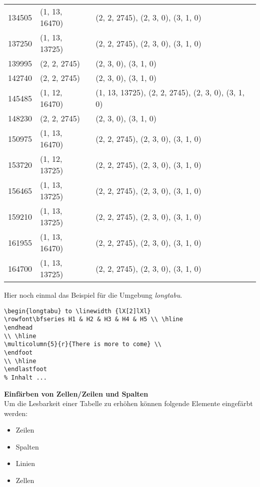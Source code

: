 \begin{center}
\begin{longtable}{|l|l|l|}
		134505 & (1, 13, 16470) & (2, 2, 2745), (2, 3, 0), (3, 1, 0) \\
		137250 & (1, 13, 13725) & (2, 2, 2745), (2, 3, 0), (3, 1, 0) \\
		139995 & (2, 2, 2745) & (2, 3, 0), (3, 1, 0) \\
		142740 & (2, 2, 2745) & (2, 3, 0), (3, 1, 0) \\
		145485 & (1, 12, 16470) & (1, 13, 13725), (2, 2, 2745), (2, 3, 0), (3, 1, 0) \\
		148230 & (2, 2, 2745) & (2, 3, 0), (3, 1, 0) \\
		150975 & (1, 13, 16470) & (2, 2, 2745), (2, 3, 0), (3, 1, 0) \\
		153720 & (1, 12, 13725) & (2, 2, 2745), (2, 3, 0), (3, 1, 0) \\
		156465 & (1, 13, 13725) & (2, 2, 2745), (2, 3, 0), (3, 1, 0) \\
		159210 & (1, 13, 13725) & (2, 2, 2745), (2, 3, 0), (3, 1, 0) \\
		161955 & (1, 13, 16470) & (2, 2, 2745), (2, 3, 0), (3, 1, 0) \\
		164700 & (1, 13, 13725) & (2, 2, 2745), (2, 3, 0), (3, 1, 0) \\
	\end{longtable}
\end{center}

Hier noch einmal das Beispiel für die Umgebung \emph{longtabu}.
\begin{lstlisting}[style=Latex,caption={Beispiel zur Umgebung: LongTabu},label=lst:tab5]
\begin{longtabu} to \linewidth {lX[2]lXl}
\rowfont\bfseries H1 & H2 & H3 & H4 & H5 \\ \hline 
\endhead
\\ \hline
\multicolumn{5}{r}{There is more to come} \\
\endfoot
\\ \hline
\endlastfoot
% Inhalt ...
\end{lstlisting}


\textbf{Einfärben von Zellen/Zeilen und Spalten}\\

Um die Lesbarkeit einer Tabelle zu erhöhen können folgende Elemente eingefärbt werden: 
\begin{itemize}
	\item Zeilen
	\item Spalten
	\item Linien
	\item Zellen
\end{itemize}

